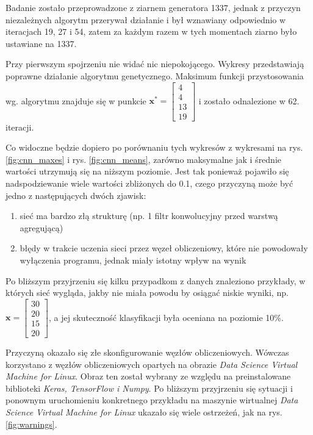 Badanie zostało przeprowadzone z ziarnem generatora 1337, jednak z przyczyn niezależnych algorytm przerywał działanie i był wznawiany odpowiednio w iteracjach 19, 27 i 54, zatem za każdym razem w tych momentach ziarno było ustawiane na 1337.

Przy pierwszym spojrzeniu nie widać nic niepokojącego.
Wykresy przedstawiają poprawne działanie algorytmu genetycznego.
Maksimum funkcji przystosowania wg. algorytmu znajduje się w punkcie $\mathbf{x^*} = \begin{bmatrix}4 \\ 4 \\ 13 \\ 19\end{bmatrix}$ i zostało odnalezione w 62. iteracji.

Co widoczne będzie dopiero po porównaniu tych wykresów z wykresami na rys. \ref{fig:cnn_maxes} i rys. \ref{fig:cnn_means}, zarówno maksymalne jak i średnie wartości utrzymują się na niższym poziomie.
Jest tak ponieważ pojawiło się nadspodziewanie wiele wartości zbliżonych do 0.1, czego przyczyną może być jedno z następujących dwóch zjawisk:
\begin{enumerate}
  \item sieć ma bardzo złą strukturę (np. 1 filtr konwolucyjny przed warstwą agregującą)
  \item błędy w trakcie uczenia sieci przez węzeł obliczeniowy, które nie powodowały wyłączenia programu, jednak miały istotny wpływ na wynik
\end{enumerate}
Po bliższym przyjrzeniu się kilku przypadkom z danych znaleziono przykłady, w których sieć wygląda, jakby nie miała powodu by osiągać niskie wyniki, np. $\mathbf{x} = \begin{bmatrix}30 \\ 20 \\ 15 \\ 20\end{bmatrix}$, a  jej skuteczność klasyfikacji była oceniana na poziomie 10\%.

Przyczyną okazało się złe skonfigurowanie węzłów obliczeniowych.
Wówczas korzystano z węzłów obliczeniowych opartych na obrazie \textit{Data Science Virtual Machine for Linux}.
Obraz ten został wybrany ze względu na preinstalowane biblioteki \textit{Keras, TensorFlow i Numpy}.
Po bliższym przyjrzeniu się sytuacji i ponownym uruchomieniu konkretnego przykładu na maszynie wirtualnej \textit{Data Science Virtual Machine for Linux} ukazało się wiele ostrzeżeń, jak na rys. \ref{fig:warnings}.


